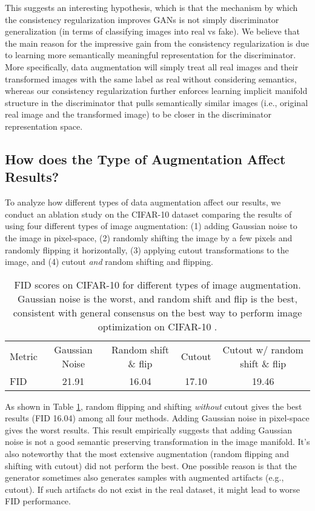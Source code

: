 \documentclass{article} \usepackage{iclr2020_conference,times}
\begin{document}
This suggests an interesting hypothesis, which is that the mechanism by which the consistency regularization improves GANs is not simply discriminator generalization (in terms of classifying images into real vs fake). We believe that the main reason for the impressive gain from the consistency regularization is due to learning more semantically meaningful representation for the discriminator. More specifically, data augmentation will simply treat all real images and their transformed images with the same label as real without considering semantics, whereas our consistency regularization further enforces learning implicit manifold structure in the discriminator that pulls semantically similar images (i.e., original real image and the transformed image) to be closer in the discriminator representation space.


\subsection{How does the Type of Augmentation Affect Results?}
To analyze how different types of data augmentation affect our results, we conduct an ablation study on the CIFAR-10 dataset comparing the results of using four different types of image augmentation: 
(1) adding Gaussian noise to the image in pixel-space,
(2) randomly shifting the image by a few pixels and randomly flipping it horizontally,
(3) applying cutout \citep{devries2017improved} transformations to the image, and
(4) cutout \textit{and} random shifting and flipping. 
\begin{table}[t]
\centering
\begin{tabular}{l|cccc}
 \hline
Metric   & Gaussian Noise &  Random shift \& flip & Cutout & Cutout w/ random shift \& flip \\ \cline{1-5}
 FID     & 21.91   & 16.04  &   17.10  &   19.46    \\
 \hline \hline
\end{tabular}
\caption{
FID scores on CIFAR-10 for different types of image augmentation.
Gaussian noise is the worst, and random shift and flip is the best, consistent with 
general consensus on the best way to perform image optimization on CIFAR-10 \citep{Zagoruyko2016WRN}.
} 
\label{tab:different_aug}
\end{table}
As shown in Table \ref{tab:different_aug}, random flipping and shifting \textit{without} cutout gives the best results (FID 16.04) among all four methods.
Adding Gaussian noise in pixel-space gives the worst results.
This result empirically suggests that adding Gaussian noise is not a good semantic preserving transformation in the image manifold.  
It's also noteworthy that the most extensive augmentation (random flipping and shifting with cutout) 
did not perform the best. One possible reason is that the generator sometimes also generates samples with augmented artifacts (e.g., cutout). If such artifacts do not exist in the real dataset, it might lead to worse FID performance.  
\end{document}
